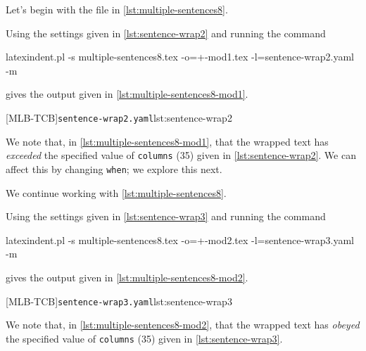  \begin{example}
 Let's begin with the file in \cref{lst:multiple-sentences8}.


 Using the settings given in \cref{lst:sentence-wrap2} and running the command

 \begin{commandshell}
latexindent.pl -s multiple-sentences8.tex -o=+-mod1.tex -l=sentence-wrap2.yaml -m
   \end{commandshell}

 gives the output given in \cref{lst:multiple-sentences8-mod1}.

 \begin{cmhtcbraster}
  [MLB-TCB]{\texttt{sentence-wrap2.yaml}}{lst:sentence-wrap2}
 \end{cmhtcbraster}

 We note that, in \cref{lst:multiple-sentences8-mod1}, that the wrapped text has
 \emph{exceeded} the specified value of \texttt{columns} (35) given in
 \cref{lst:sentence-wrap2}. We can affect this by changing \texttt{when}; we explore this
 next.
 \end{example}

 \begin{example}
 We continue working with \cref{lst:multiple-sentences8}.

 Using the settings given in \cref{lst:sentence-wrap3} and running the command

 \begin{commandshell}
latexindent.pl -s multiple-sentences8.tex -o=+-mod2.tex -l=sentence-wrap3.yaml -m
   \end{commandshell}

 gives the output given in \cref{lst:multiple-sentences8-mod2}.

 \begin{cmhtcbraster}
  [MLB-TCB]{\texttt{sentence-wrap3.yaml}}{lst:sentence-wrap3}
 \end{cmhtcbraster}

 We note that, in \cref{lst:multiple-sentences8-mod2}, that the wrapped text has
 \emph{obeyed} the specified value of \texttt{columns} (35) given in
 \cref{lst:sentence-wrap3}.
 \end{example}

